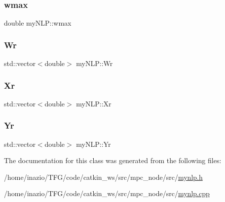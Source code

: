 \mbox{\label{classmyNLP_afc3c8ef8ab19ef14565825f779ae104c}} 
\subsubsection{\texorpdfstring{wmax}{wmax}}
{\footnotesize\ttfamily double my\+N\+L\+P\+::wmax\hspace{0.3cm}{\ttfamily [private]}}

\mbox{\label{classmyNLP_aa3176f5469491b6432f6da85a426957e}} 
\subsubsection{\texorpdfstring{Wr}{Wr}}
{\footnotesize\ttfamily std\+::vector$<$double$>$ my\+N\+L\+P\+::\+Wr}

\mbox{\label{classmyNLP_a723f46ade7987968c50f5b1dc4044bc8}} 
\subsubsection{\texorpdfstring{Xr}{Xr}}
{\footnotesize\ttfamily std\+::vector$<$double$>$ my\+N\+L\+P\+::\+Xr}

\mbox{\label{classmyNLP_af981a9af6b17e3b406faf365898cfd10}} 
\subsubsection{\texorpdfstring{Yr}{Yr}}
{\footnotesize\ttfamily std\+::vector$<$double$>$ my\+N\+L\+P\+::\+Yr}



The documentation for this class was generated from the following files\+:\begin{DoxyCompactItemize}
\item 
/home/inazio/\+T\+F\+G/code/catkin\+\_\+ws/src/mpc\+\_\+node/src/\hyperlink{mynlp_8h}{mynlp.\+h}\item 
/home/inazio/\+T\+F\+G/code/catkin\+\_\+ws/src/mpc\+\_\+node/src/\hyperlink{mynlp_8cpp}{mynlp.\+cpp}\end{DoxyCompactItemize}
